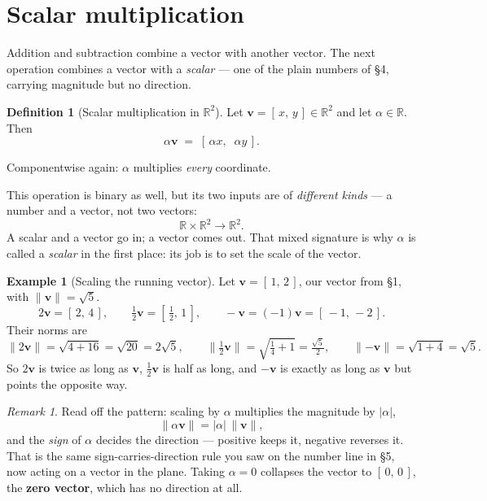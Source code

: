\documentclass[11pt]{article}
\theoremstyle{definition}
\newtheorem{defn}{Definition}
\newtheorem{ex}{Example}
\theoremstyle{remark}
\newtheorem*{rmk}{Remark}
\newcommand{\R}{\mathbb{R}}
\newcommand{\vc}[1]{\mathbf{#1}}
\newcommand{\norm}[1]{\lVert #1\rVert}
\begin{document}
\section{Scalar multiplication}
Addition and subtraction combine a vector with another vector. The next
operation combines a vector with a \emph{scalar} --- one of the plain numbers of
\S4, carrying magnitude but no direction.

\begin{defn}[Scalar multiplication in $\R^2$]
Let $\vc{v}=[\,x,\,y\,]\in\R^{2}$ and let $\alpha\in\R$. Then
\[
  \alpha\vc{v} \;=\; [\,\alpha x,\;\;\alpha y\,].
\]
\end{defn}

\noindent Componentwise again: $\alpha$ multiplies \emph{every} coordinate.

\smallskip
\noindent This operation is binary as well, but its two inputs are of
\emph{different kinds} --- a number and a vector, not two vectors:
\[
  \R\times\R^{2}\to\R^{2}.
\]
A scalar and a vector go in; a vector comes out. That mixed signature is why
$\alpha$ is called a \emph{scalar} in the first place: its job is to set the
scale of the vector.

\begin{ex}[Scaling the running vector]
Let $\vc{v}=[\,1,\,2\,]$, our vector from \S1, with $\norm{\vc{v}}=\sqrt{5}$.
\[
  2\vc{v}=[\,2,\,4\,],
  \qquad
  \tfrac12\vc{v}=[\,\tfrac12,\,1\,],
  \qquad
  -\vc{v}=(-1)\vc{v}=[\,-1,\,-2\,].
\]
Their norms are
\[
  \norm{2\vc{v}}=\sqrt{4+16}=\sqrt{20}=2\sqrt5,
  \qquad
  \norm{\tfrac12\vc{v}}=\sqrt{\tfrac14+1}=\tfrac{\sqrt5}{2},
  \qquad
  \norm{-\vc{v}}=\sqrt{1+4}=\sqrt5 .
\]
So $2\vc{v}$ is twice as long as $\vc{v}$, $\tfrac12\vc{v}$ is half as long, and
$-\vc{v}$ is exactly as long as $\vc{v}$ but points the opposite way.
\end{ex}

\begin{rmk}
Read off the pattern: scaling by $\alpha$ multiplies the magnitude by
$\lvert\alpha\rvert$,
\[
  \norm{\alpha\vc{v}}=\lvert\alpha\rvert\,\norm{\vc{v}},
\]
and the \emph{sign} of $\alpha$ decides the direction --- positive keeps it,
negative reverses it. That is the same sign-carries-direction rule you saw on
the number line in \S5, now acting on a vector in the plane. Taking $\alpha=0$
collapses the vector to $[\,0,\,0\,]$, the \textbf{zero vector}, which has no
direction at all.
\end{rmk}
\end{document}
